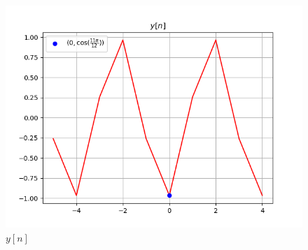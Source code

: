 \documentclass[journal,12pt,twocolumn]{IEEEtran}
\begin{document}
 \begin{figure}[!ht]
\centering
 \includegraphics[width=\columnwidth]{Graphs/y.png}
 \caption{$y[n]$}
 \end{figure}
\end{document}
